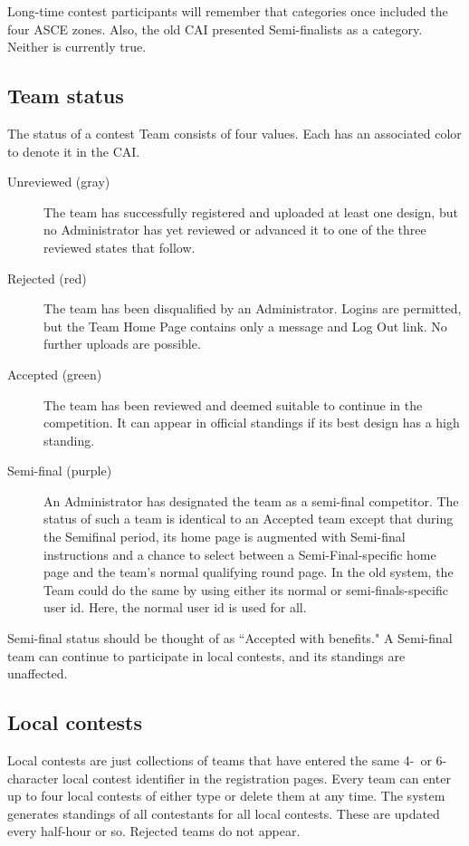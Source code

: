 \documentclass[11pt,letterpaper]{refart}
\begin{document}
Long-time contest participants will remember that categories once included the
four ASCE zones. Also, the old CAI presented Semi-finalists as a category.
Neither is currently true.

\subsection{Team status}
The status of a contest Team consists of four values.  
Each has an associated color to denote
it in the CAI.
\begin{description}
\item[Unreviewed (gray)] The team has successfully registered and 
uploaded at least one design,
but no Administrator has yet reviewed or advanced it to one of the three reviewed
states that follow.
\item[Rejected (red)] The team has been disqualified by an Administrator. 
Logins are permitted, but the Team Home Page contains only a message 
and Log Out link.  No further uploads are possible.
\item[Accepted (green)] The team has been reviewed and deemed suitable
to continue in the competition. It can appear in official standings if its best
design has a high standing.
\item[Semi-final (purple)] An Administrator has designated the team as
a semi-final competitor.  The status of such a team is identical to an Accepted
team except that during the Semifinal period, its home page is augmented
with Semi-final instructions and a chance to select between a Semi-Final-specific
home page and the team's normal qualifying round page.  In the old system, the
Team could do the same by using either its normal or semi-finals-specific
user id.  Here, the normal user id is used for all.
\end{description}
Semi-final status should be thought of as ``Accepted with benefits."  A Semi-final
team can continue to participate in local contests, and its standings are 
unaffected.

\subsection{Local contests}
Local contests are just collections of teams that have entered the same
4-\ or 6-character local contest identifier in the registration pages. Every
team can enter up to four local contests of either type or delete them 
at any time.  The  system generates standings of all contestants for 
all local contests.  These are updated every half-hour or so.  Rejected teams 
do not appear.
\end{document}
